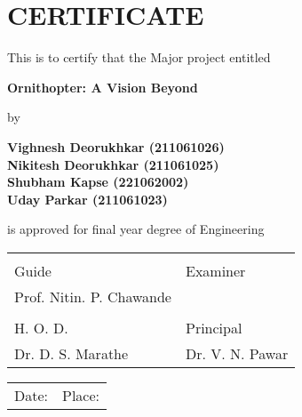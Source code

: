 \chapter*{CERTIFICATE}
\thispagestyle{empty}

This is to certify that the Major project entitled

\vspace{0.5cm}
\begin{center}
    \large\bfseries Ornithopter: A Vision Beyond
\end{center}
\vspace{0.5cm}

by

\vspace{0.5cm}
\begin{center}
    \textbf{Vighnesh Deorukhkar (211061026)}\\
    \textbf{Nikitesh Deorukhkar (211061025)}\\
    \textbf{Shubham Kapse (221062002)}\\
    \textbf{Uday Parkar (211061023)}
\end{center}
\vspace{0.5cm}

is approved for final year degree of Engineering

\vspace{2cm}
\begin{tabularx}{\textwidth}{X X}
    \hrulefill & \hrulefill \\
    Guide & Examiner \\
    Prof. Nitin. P. Chawande & \\
    
    \vspace{1cm}
    \hrulefill & \hrulefill \\
    H. O. D. & Principal \\
    Dr. D. S. Marathe & Dr. V. N. Pawar \\
\end{tabularx}

\vspace{1cm}
\begin{tabularx}{\textwidth}{X X}
    Date: \hrulefill & Place: \hrulefill \\
\end{tabularx}